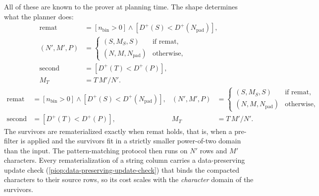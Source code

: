  All of these are known to the prover at planning time. The shape determines what the planner does:
\ifsp
\begin{align*}
  \mathrm{remat}  &= [n_{\mathrm{bin}} > 0] \wedge [D^+(S) < D^+(N_{\mathrm{pad}})],\\
  (N', M', P)     &= \begin{cases} (S, M_S, S) & \text{if } \mathrm{remat},\\
                                    (N, M, N_{\mathrm{pad}}) & \text{otherwise,} \end{cases}\\
  \mathrm{second} &= [D^+(T) < D^+(P)],\\
  M_T             &= T\, M' / N'.
\end{align*}
\else
\begin{align*}
  \mathrm{remat}  &= [n_{\mathrm{bin}} > 0] \wedge [D^+(S) < D^+(N_{\mathrm{pad}})], &
  (N', M', P)     &= \begin{cases} (S, M_S, S) & \text{if } \mathrm{remat},\\
                                    (N, M, N_{\mathrm{pad}}) & \text{otherwise,} \end{cases}\\
  \mathrm{second} &= [D^+(T) < D^+(P)], &
  M_T             &= T\, M' / N'.
\end{align*}
\fi
The survivors are rematerialized exactly when $\mathrm{remat}$ holds, that is, when a pre-filter is applied and the survivors fit in a strictly smaller power-of-two domain than the input. The pattern-matching protocol then runs on $N'$ rows and $M'$ characters. Every rematerialization of a string column carries a data-preserving update check (\cref{piop:data-preserving-update-check}) that binds the compacted characters to their source rows, so its cost scales with the \emph{character} domain of the survivors.

